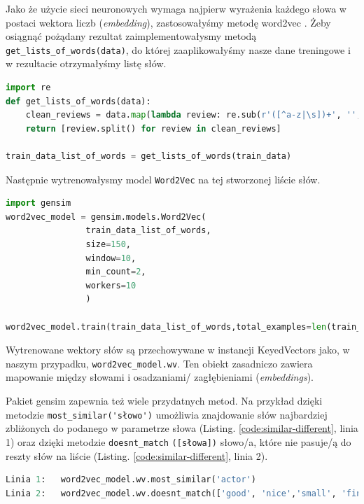 Jako że użycie sieci neuronowych wymaga najpierw wyrażenia każdego słowa w postaci wektora liczb (\textit{embedding}), zastosowałyśmy metodę word2vec \cite{mikolov2013efficient}. Żeby osiągnąć pożądany rezultat zaimplementowałysmy metodą \verb|get_lists_of_words(data)|, do której zaaplikowałyśmy nasze dane treningowe i w rezultacie otrzymałyśmy listę słów.

\begin{lstlisting}[language=Python,frame=single, breaklines=true, caption=Stworzenie listy słów dla modelu Word2Vec.,label=code:w2v-wordlist]
import re
def get_lists_of_words(data):
	clean_reviews = data.map(lambda review: re.sub(r'([^a-z|\s])+', '', review.lower()))
	return [review.split() for review in clean_reviews]

train_data_list_of_words = get_lists_of_words(train_data)
\end{lstlisting}	

\noindent Następnie wytrenowałysmy model \verb|Word2Vec| na tej stworzonej liście słów.
\begin{lstlisting}[language=Python,frame=single, breaklines=true, caption=Trenowanie modelu Word2vec.,label=code:w2v]
import gensim
word2vec_model = gensim.models.Word2Vec(
				train_data_list_of_words,
				size=150,  
				window=10, 
				min_count=2, 
				workers=10
				)

word2vec_model.train(train_data_list_of_words,total_examples=len(train_data_list_of_words),epochs=10)
\end{lstlisting}

\noindent Wytrenowane wektory słów są przechowywane w instancji KeyedVectors jako, w naszym przypadku, \verb|word2vec_model.wv|. Ten obiekt zasadniczo zawiera mapowanie między słowami i osadzaniami/ zagłębieniami (\textit{embeddings}).


\noindent Pakiet gensim zapewnia też wiele przydatnych metod. Na przykład dzięki metodzie \verb|most_similar('słowo')| umożliwia znajdowanie słów najbardziej zbliżonych do podanego w parametrze słowa (Listing. \ref{code:similar-different}, linia 1) oraz dzięki metodzie \verb|doesnt_match| \verb|([słowa])| słowo/a, które nie pasuje/ą do reszty słów na liście (Listing. \ref{code:similar-different}, linia 2).

\begin{lstlisting}[language=Python,frame=single, breaklines=true, caption=Znajdowanie najbardziej zbliżonych i niepasujących słów.,label=code:similar-different]
Linia 1:   word2vec_model.wv.most_similar('actor')
Linia 2:   word2vec_model.wv.doesnt_match(['good', 'nice','small', 'fine'])
\end{lstlisting}

